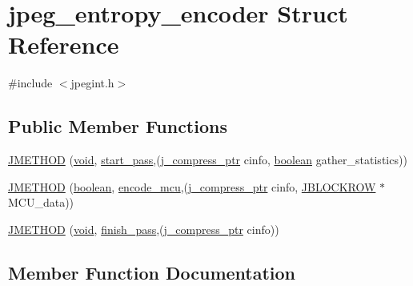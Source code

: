 \hypertarget{structjpeg__entropy__encoder}{}\section{jpeg\+\_\+entropy\+\_\+encoder Struct Reference}
\label{structjpeg__entropy__encoder}


{\ttfamily \#include $<$jpegint.\+h$>$}

\subsection*{Public Member Functions}
\begin{DoxyCompactItemize}
\item 
\hyperlink{structjpeg__entropy__encoder_aa42cc97f950746e53857b958e00519dd}{J\+M\+E\+T\+H\+O\+D} (\hyperlink{png_8h_aa8c59027f9ab2769342f248709d68d17}{void}, \hyperlink{jddctmgr_8c_a1964f006adb8fb80f57e455f6452aec1}{start\+\_\+pass},(\hyperlink{jpeglib_8h_add2a072c54e3a51550f4975f7ddb91e7}{j\+\_\+compress\+\_\+ptr} cinfo, \hyperlink{jmorecfg_8h_a7c6368b321bd9acd0149b030bb8275ed}{boolean} gather\+\_\+statistics))
\item 
\hyperlink{structjpeg__entropy__encoder_a6852c01b9a63cceaae5f1d0e4ef1185a}{J\+M\+E\+T\+H\+O\+D} (\hyperlink{jmorecfg_8h_a7c6368b321bd9acd0149b030bb8275ed}{boolean}, \hyperlink{jcarith_8c_a72e97499e846635676b53db9977b4a5a}{encode\+\_\+mcu},(\hyperlink{jpeglib_8h_add2a072c54e3a51550f4975f7ddb91e7}{j\+\_\+compress\+\_\+ptr} cinfo, \hyperlink{jpeglib_8h_a04dea0959d9bd9e8ddad83597161453b}{J\+B\+L\+O\+C\+K\+R\+O\+W} $\ast$M\+C\+U\+\_\+data))
\item 
\hyperlink{structjpeg__entropy__encoder_a349e641fd2289448e8169b8aa8edefa5}{J\+M\+E\+T\+H\+O\+D} (\hyperlink{png_8h_aa8c59027f9ab2769342f248709d68d17}{void}, \hyperlink{jdarith_8c_a51cf466731c95bff0e472f382544d8c6}{finish\+\_\+pass},(\hyperlink{jpeglib_8h_add2a072c54e3a51550f4975f7ddb91e7}{j\+\_\+compress\+\_\+ptr} cinfo))
\end{DoxyCompactItemize}


\subsection{Member Function Documentation}
\hypertarget{structjpeg__entropy__encoder_aa42cc97f950746e53857b958e00519dd}{}
